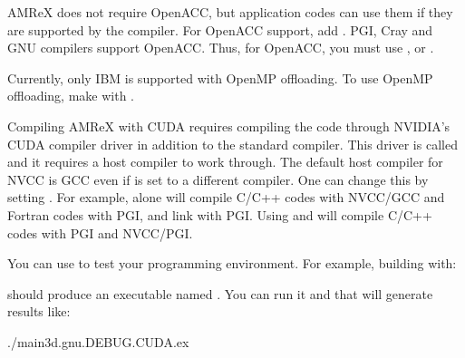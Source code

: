 \documentclass[letterpaper,10pt,english]{sphinxmanual}
\begin{document}
\sphinxAtStartPar
AMReX does not require OpenACC, but application codes
can use them if they are supported by the compiler.  For OpenACC support, add
.  PGI, Cray and GNU compilers support OpenACC.  Thus,
for OpenACC, you must use ,  or .

\sphinxAtStartPar
Currently, only IBM is supported with OpenMP offloading. To use OpenMP
offloading, make with .

\sphinxAtStartPar
Compiling AMReX with CUDA requires compiling the code through NVIDIA’s
CUDA compiler driver in addition to the standard compiler.  This driver
is called  and it requires a host compiler to work through.
The default host compiler for NVCC is GCC even if  is set to
a different compiler.  One can change this by setting .
For example,  alone will compile C/C++ codes with NVCC/GCC
and Fortran codes with PGI, and link with PGI.  Using  and
 will compile C/C++ codes with PGI and NVCC/PGI.

\sphinxAtStartPar
You can use  to test your programming
environment.  For example, building with:

\begin{sphinxVerbatim}[commandchars=\\\{\}]
\end{sphinxVerbatim}

\sphinxAtStartPar
should produce an executable named .  You
can run it and that will generate results like:

\begin{sphinxVerbatim}[commandchars=\\\{\}]
./main3d.gnu.DEBUG.CUDA.ex
\end{sphinxVerbatim}
\end{document}
